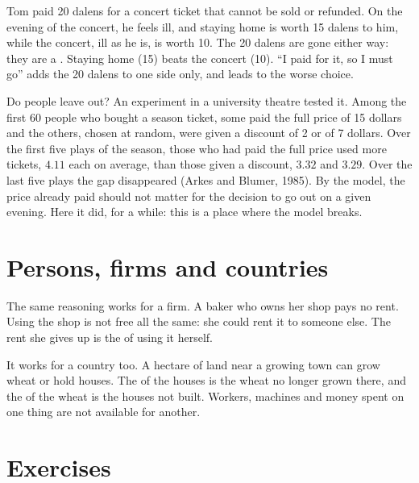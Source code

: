 \begin{example}
Tom paid 20 dalens for a concert ticket that cannot be sold or refunded. On the
evening of the concert, he feels ill, and staying home is worth 15 dalens to him,
while the concert, ill as he is, is worth 10. The 20 dalens are gone either way:
they are a . Staying home (15) beats the concert (10). ``I paid for it, so
I must go'' adds the 20 dalens to one side only, and leads to the worse choice.
\end{example}

Do people leave  out? An experiment in a university theatre tested it.
Among the first 60 people who bought a season ticket, some paid the full price of
15 dollars and the others, chosen at random, were given a discount of 2 or of 7
dollars. Over the first five plays of the season, those who had paid the full price
used more tickets, $4.11$ each on average, than those given a discount, $3.32$ and
$3.29$. Over the last five plays the gap disappeared (Arkes and Blumer, 1985). By the
model, the price already paid should not matter for the decision to go out on a
given evening. Here it did, for a while: this is a place where the model breaks.

\section{Persons, firms and countries}

The same reasoning works for a firm. A baker who owns her shop pays no rent. Using
the shop is not free all the same: she could rent it to someone else. The rent she
gives up is the  of using it herself.

It works for a country too. A hectare of land near a growing town can grow wheat or
hold houses. The  of the houses is the wheat no longer grown there,
and the  of the wheat is the houses not built. Workers, machines and
money spent on one thing are not available for another.

\section{Exercises}

